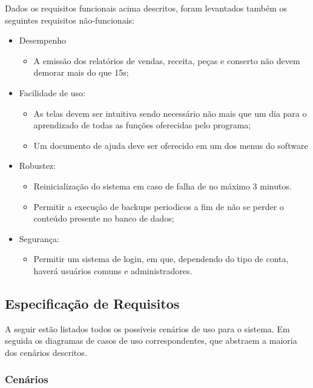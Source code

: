 \documentclass[a4paper,10pt]{article}
\begin{document}
Dados os requisitos funcionais acima descritos, foram levantados também os seguintes requisitos não-funcionais:

\begin{itemize}

\item Desempenho
\begin{itemize}
\item A emissão dos relatórios de vendas, receita, peças e conserto não devem demorar mais do que 15s;
\end{itemize}
\item Facilidade de uso:
\begin{itemize}
\item As telas devem ser intuitiva sendo necessário não mais que um dia para o aprendizado de todas as funções oferecidas pelo programa;
\item Um documento de ajuda deve ser oferecido em um dos menus do software
\end{itemize}
\item Robustez:
\begin{itemize}
\item Reinicialização do sistema em caso de falha de no máximo 3 minutos.
\item Permitir a execução de backups periodicos a fim de não se perder o conteúdo presente no banco de dados;
\end{itemize}
\item Segurança:
\begin{itemize}
\item Permitir um sistema de login, em que, dependendo do tipo de conta, haverá usuários comuns e administradores.
\end{itemize}
\end{itemize}
\subsection{Especificação de Requisitos}

A seguir estão listados todos os possíveis cenários de uso para o sistema. Em seguida os diagramas de casos de uso correspondentes, que abstraem a maioria dos cenários descritos.

\subsubsection{Cenários}
\end{document}
